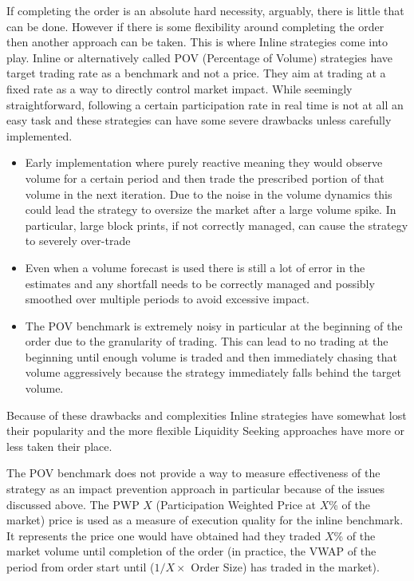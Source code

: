 If completing the order is an absolute hard necessity, arguably, there is little that can be done. However if there is some flexibility around completing the order then another approach can be taken. This is where Inline strategies come into play. Inline or alternatively called POV (Percentage of Volume) strategies have target trading rate as a benchmark and not a price. They aim at trading at a fixed rate as a way to directly control market impact. While seemingly straightforward, following a certain participation rate in real time is not at all an easy task and these strategies can have some severe drawbacks unless carefully implemented.


\begin{itemize}
\item Early implementation where purely reactive meaning they would observe volume for a certain period and then trade the prescribed portion of that volume in the next iteration. Due to the noise in the volume dynamics this could lead the strategy to oversize the market after a large volume spike. In particular, large block prints, if not correctly managed, can cause the strategy to severely over-trade

\item Even when a volume forecast is used there is still a lot of error in the estimates and any shortfall needs to be correctly managed and possibly smoothed over multiple periods to avoid excessive impact.

\item The POV benchmark is extremely noisy in particular at the beginning of the order due to the granularity of trading. This can lead to no trading at the beginning until enough volume is traded and then immediately chasing that volume aggressively because the strategy immediately falls behind the target volume.
\end{itemize}


Because of these drawbacks and complexities Inline strategies have somewhat lost their popularity and the more flexible Liquidity Seeking approaches  have more or less taken their place.


The POV benchmark does not provide a way to measure effectiveness of the strategy as an impact prevention approach in particular because of the issues discussed above. The PWP $X$ (Participation Weighted Price at $X$\% of the market) price is used as a measure of execution quality for the inline benchmark. It represents the price one would have obtained had they traded $X$\% of the market volume until completion of the order (in practice, the VWAP of the period from order start until ($1/X \times$ Order Size) has traded in the market). \twomedskip

